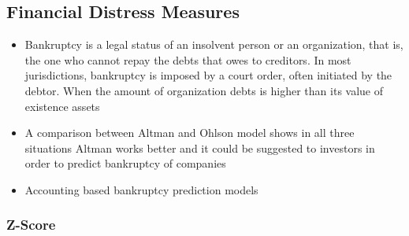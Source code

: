 \documentclass[12pt]{article}
\begin{document}
\subsection{Financial Distress Measures}

\begin{itemize}
    \item Bankruptcy is a legal status of an insolvent person or an organization, that is, the one who cannot repay the debts that owes to creditors. In most jurisdictions, bankruptcy is imposed by a court order, often initiated by the debtor. When the amount of organization debts is higher than its value of existence assets \citep{Karamzadeh2013}

    \item A comparison between Altman and Ohlson model shows in all three situations Altman works better and it could be suggested to investors in order to predict bankruptcy of companies \citep{Karamzadeh2013} 

    \item Accounting based bankruptcy prediction models 
\end{itemize}

    \subsubsection{Z-Score}
\end{document}
